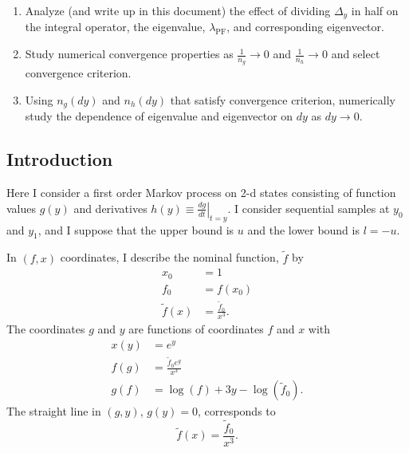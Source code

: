 \documentclass[]{article}
\begin{document}
\begin{enumerate}
\item Analyze (and write up in this document) the effect of dividing
  $\Delta_y$ in half on the integral operator, the eigenvalue,
  $\lambda_{\text{PF}}$, and corresponding eigenvector.
\item Study numerical convergence properties as $\frac{1}{n_g}
  \rightarrow 0$ and $\frac{1}{n_h} \rightarrow 0$ and select
  convergence criterion.
\item Using $n_g(dy)$ and $n_h(dy)$ that satisfy convergence
  criterion, numerically study the dependence of eigenvalue and
  eigenvector on $dy$ as $dy \rightarrow 0$.
\end{enumerate}

\subsection{Introduction}
  \label{sec:introduction}

Here I consider a first order Markov process on 2-d states consisting
of function values $g(y)$ and derivatives $h(y) \equiv \left. \frac{d
    g }{d t} \right|_{t=y}$.  I consider sequential samples at $y_0$
and $y_1$, and I suppose that the upper bound is $u$ and the lower
bound is $l=-u$.

In $(f,x)$ coordinates, I describe the nominal function, $\tilde f$ by
\begin{align*}
  x_0 &= 1\\
  f_0 &= f(x_0) \\
  \tilde f(x) &= \frac{\tilde f_0}{x^3}.
\end{align*}
The coordinates $g$ and $y$ are functions of coordinates $f$ and $x$ with
\begin{align*}
  x(y) &= e^y \\
  f(g) &= \frac{\tilde f_0 e^{g}}{x^3} \\
  g(f) &= \log(f) + 3y - \log(\tilde f_0).
\end{align*}
The straight line in $(g,y)$, $g(y) = 0$, corresponds to
\begin{equation*}
  \tilde f(x) = \frac{\tilde f_0}{x^3}.
\end{equation*}
\end{document}
